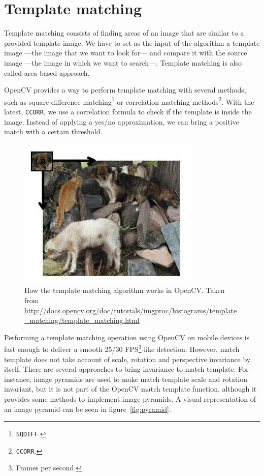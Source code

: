 \section{Template matching}
Template matching\cite{ocv01} consists of finding areas of an image that are similar to a
provided template image. We have to set as the input of the algorithm a template
image ---the image that we want to look for--- and compare it with the source image
---the image in which we want to search\cite{tmatch01}---. Template matching is also
called area-based approach. 

OpenCV provides a way to perform template matching with several methods, such as
square difference matching\footnote{\texttt{SQDIFF}.} or correlation-matching
methods\footnote{\texttt{CCORR}.}. With the latest, \texttt{CCORR}, we use a 
correlation formula to check if the template is inside the image. Instead of
applying a yes/no approximation, we can bring a positive match with a certain
threshold. 

\begin{figure}
\centering
\includegraphics[scale=0.75]{img/templatematch.png}
\caption{\label{fig:templatematch}How the template matching algorithm works in
  OpenCV. Taken from
  \url{http://docs.opencv.org/doc/tutorials/imgproc/histograms/template_matching/template_matching.html}} 
\end{figure} 

Performing a template matching operation using OpenCV on mobile devices is fast
enough to deliver a smooth 25/30 FPS\footnote{Frames per second.}-like
detection. However, match template does not 
take account of scale, rotation and perspective invariance by itself. There are
several approaches to bring invariance to match template. For instance, image
pyramids are used to make match template scale and rotation
invariant\cite{4368176}, but it is not part of the OpenCV match template function, although it
provides some methods to implement image pyramids\cite{ocv02}. A visual
representation of an image pyramid can be seen in figure~\ref{fig:pyramid}. 

